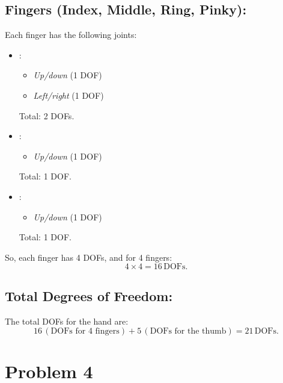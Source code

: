 \documentclass[12pt]{article}
\begin{document}
\subsection*{Fingers (Index, Middle, Ring, Pinky):}
Each finger has the following joints:
\begin{itemize}
    \item {}:
      \begin{itemize}
        \item \textit{Up/down} (1 DOF)
        \item \textit{Left/right} (1 DOF)
      \end{itemize}
      Total: 2 DOFs.
      
    \item {}:
      \begin{itemize}
        \item \textit{Up/down} (1 DOF)
      \end{itemize}
      Total: 1 DOF.
      
    \item {}:
      \begin{itemize}
        \item \textit{Up/down} (1 DOF)
      \end{itemize}
      Total: 1 DOF.
\end{itemize}

So, each finger has 4 DOFs, and for 4 fingers:
\[
4 \times 4 = 16 \, \text{DOFs}.
\]

\subsection*{Total Degrees of Freedom:}
The total DOFs for the hand are:
\[
16 \, (\text{DOFs for 4 fingers}) + 5 \, (\text{DOFs for the thumb}) = 21 \, \text{DOFs}.
\]


\section{Problem 4}
\end{document}
